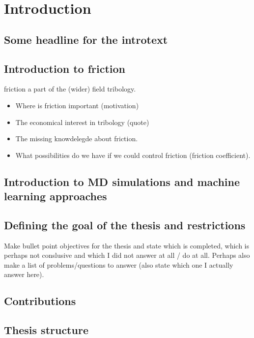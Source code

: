 \chapter*{Introduction}

\section{Some headline for the introtext}

\section{Introduction to friction}
friction a part of the (wider) field tribology.

\begin{itemize}
    \item Where is friction important (motivation)
    \item The economical interest in tribology (quote)
    \item The missing knowdelegde about friction.
    \item What possibilities do we have if we could control friction (friction coefficient).
\end{itemize}


\section{Introduction to MD simulations and machine learning approaches}

\section{Defining the goal of the thesis and restrictions}
Make bullet point objectives for the thesis and state which is completed, which is perhaps not conslusive and which I did not answer at all / do at all. Perhaps also make a list of problems/questions to answer (also state which one I actually answer here).


\section{Contributions}

\section{Thesis structure }


